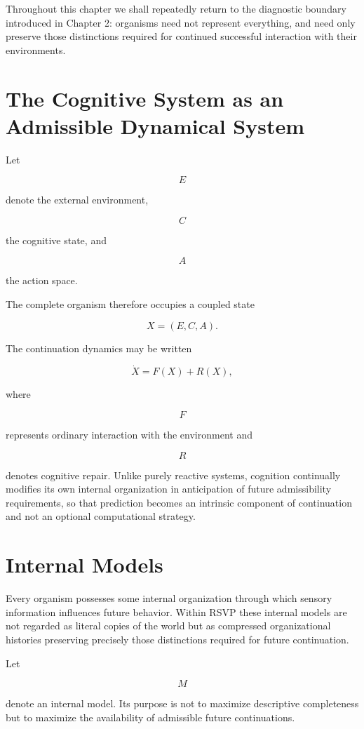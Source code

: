 \documentclass[11pt,oneside]{book}
\numberwithin{equation}{chapter}
\theoremstyle{definition}
\theoremstyle{plain}
\begin{document}
Throughout this chapter we shall repeatedly return to the diagnostic boundary introduced in Chapter 2: organisms need not represent everything, and need only preserve those distinctions required for continued successful interaction with their environments.

\section{The Cognitive System as an Admissible Dynamical System}

Let

\[
E
\]

denote the external environment,

\[
C
\]

the cognitive state, and

\[
A
\]

the action space.

The complete organism therefore occupies a coupled state

\[
X=(E,C,A).
\]

The continuation dynamics may be written

\[
\dot X = F(X) + R(X),
\]

where

\[
F
\]

represents ordinary interaction with the environment and

\[
R
\]

denotes cognitive repair. Unlike purely reactive systems, cognition continually modifies its own internal organization in anticipation of future admissibility requirements, so that prediction becomes an intrinsic component of continuation and not an optional computational strategy.

\section{Internal Models}

Every organism possesses some internal organization through which sensory information influences future behavior. Within RSVP these internal models are not regarded as literal copies of the world but as compressed organizational histories preserving precisely those distinctions required for future continuation.

Let

\[
M
\]

denote an internal model. Its purpose is not to maximize descriptive completeness but to maximize the availability of admissible future continuations.
\end{document}
